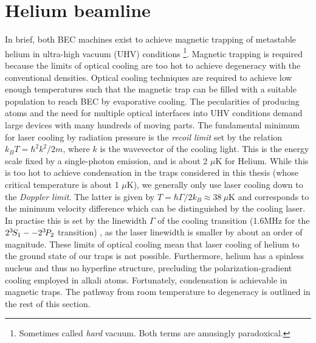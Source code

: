 \section{Helium beamline}
	In brief, both BEC machines exist to achieve magnetic trapping of metastable helium in ultra-high vacuum (UHV) conditions \footnote{Sometimes called \emph{hard} vacuum. Both terms are amusingly paradoxical.}. Magnetic trapping is required because the limits of optical cooling are too hot to achieve degeneracy with the conventional densities. Optical cooling techniques are required to achieve low enough temperatures such that the magnetic trap can be filled with a suitable population to reach BEC by evaporative cooling. The pecularities of producing \mhe atoms and the need for multiple optical interfaces into UHV conditions demand large devices with many hundreds of moving parts. 
	The fundamental minimum for laser cooling by radiation pressure is the \emph{recoil limit} set by the relation $k_B T = \hbar^2k^2/2m$, where $k$ is the wavevector of the cooling light. This is the energy scale fixed by a single-photon emission, and is about 2 $\mu$K for Helium. While this is too hot to achieve condensation in the traps considered in this thesis (whose critical temperature is about 1 $\mu$K), we generally only use laser cooling down to the \emph{Doppler limit}. The latter is given by $T = \hbar\Gamma/2 k_B\approx 38~\mu$K and corresponds to the minimum velocity difference which can be distinguished by the cooling laser. In practise this is set by the linewidth $\Gamma$ of the cooling transition (1.6MHz for the $2^{3\!} S_1 -- 2^{3\!} P_2$ transition) , as the laser linewidth is smaller by about an order of magnitude\cite{shin16}. These limits of optical cooling mean that laser cooling of helium to the ground state of our traps is not possible. Furthermore, helium has a spinless nucleus and thus no hyperfine structure, precluding the polarization-gradient cooling employed in alkali atoms. Fortunately, condensation is achievable in magnetic traps. The pathway from room temperature to degeneracy is outlined in the rest of this section.


